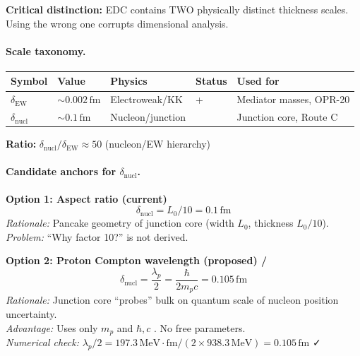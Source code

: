 \begin{tcolorbox}[colback=orange!5!white, colframe=orange!60!black,
                  title={\textbf{$\delta$ Decision Tree: Two Thickness Scales in EDC}}]
\label{box:delta_decision_tree}

\textbf{Critical distinction:} EDC contains TWO physically distinct thickness scales.
Using the wrong one corrupts dimensional analysis.

\paragraph{Scale taxonomy.}
\begin{center}
\begin{tabular}{lllll}
\toprule
\textbf{Symbol} & \textbf{Value} & \textbf{Physics} & \textbf{Status} & \textbf{Used for} \\
\midrule
$\delta_{\mathrm{EW}}$ & $\sim 0.002\,\mathrm{fm}$ & Electroweak/KK & \tagP{}+\tagBL{} & Mediator masses, OPR-20 \\
$\delta_{\mathrm{nucl}}$ & $\sim 0.1\,\mathrm{fm}$ & Nucleon/junction & \tagI{} & Junction core, Route C \\
\bottomrule
\end{tabular}
\end{center}

\textbf{Ratio:} $\delta_{\mathrm{nucl}} / \delta_{\mathrm{EW}} \approx 50$ (nucleon/EW hierarchy)

\paragraph{Candidate anchors for $\delta_{\mathrm{nucl}}$.}

\textbf{Option 1: Aspect ratio (current) \tagI{}}
\begin{equation}
\delta_{\mathrm{nucl}} = L_0/10 = 0.1\,\mathrm{fm}
\end{equation}
\emph{Rationale:} Pancake geometry of junction core (width $L_0$, thickness $L_0/10$).\\
\emph{Problem:} ``Why factor 10?'' is not derived.

\textbf{Option 2: Proton Compton wavelength (proposed) \tagI{}/\tagDc{}}
\begin{equation}
\delta_{\mathrm{nucl}} = \frac{\lambda_p}{2} = \frac{\hbar}{2 m_p c} = 0.105\,\mathrm{fm}
\end{equation}
\emph{Rationale:} Junction core ``probes'' bulk on quantum scale of nucleon position uncertainty.\\
\emph{Advantage:} Uses only $m_p$ \tagBL{} and $\hbar, c$ \tagDef{}. No free parameters.\\
\emph{Numerical check:} $\lambda_p/2 = 197.3\,\mathrm{MeV\cdot fm} / (2 \times 938.3\,\mathrm{MeV}) = 0.105\,\mathrm{fm}$ ✓


\end{tcolorbox}
